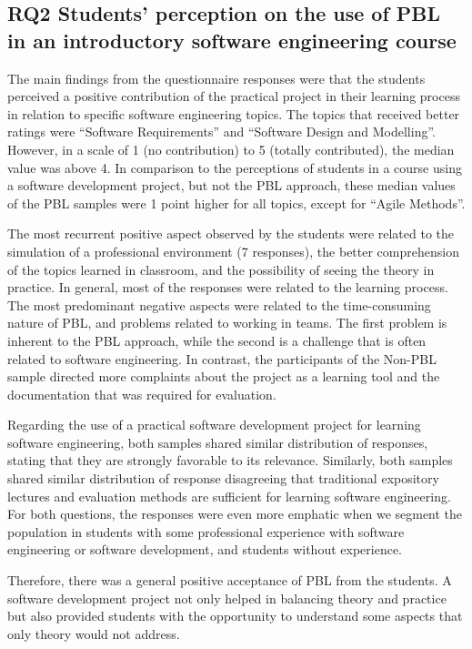 \subsection{RQ2 Students’ perception on the use of PBL in an introductory software engineering course}

The main findings from the questionnaire responses were that the students perceived a positive contribution of the practical project in their learning process in relation to specific software engineering topics. The topics that received better ratings were “Software Requirements” and “Software Design and Modelling”. However, in a scale of 1 (no contribution) to 5 (totally contributed), the median value was above 4. In comparison to the perceptions of students in a course using a software development project, but not the PBL approach, these median values of the PBL samples were 1 point higher for all topics, except for “Agile Methods”.

The most recurrent positive aspect observed by the students were related to the simulation of a professional environment (7 responses), the better comprehension of the topics learned in classroom, and the possibility of seeing the theory in practice. In general, most of the responses were related to the learning process. The most predominant negative aspects were related to the time-consuming nature of PBL, and problems related to working in teams. The first problem is inherent to the PBL approach, while the second is a challenge that is often related to software engineering. In contrast, the participants of the Non-PBL sample directed more complaints about the project as a learning tool and the documentation that was required for evaluation.

Regarding the use of a practical software development project for learning software engineering, both samples shared similar distribution of responses, stating that they are strongly favorable to its relevance. Similarly, both samples shared similar distribution of response disagreeing that traditional expository lectures and evaluation methods are sufficient for learning software engineering. For both questions, the responses were even more emphatic when we segment the population in students with some professional experience with software engineering or software development, and students without experience. 

Therefore, there was a general positive acceptance of PBL from the students. A software development project not only helped in balancing theory and practice but also provided students with the opportunity to understand some aspects that only theory would not address.


